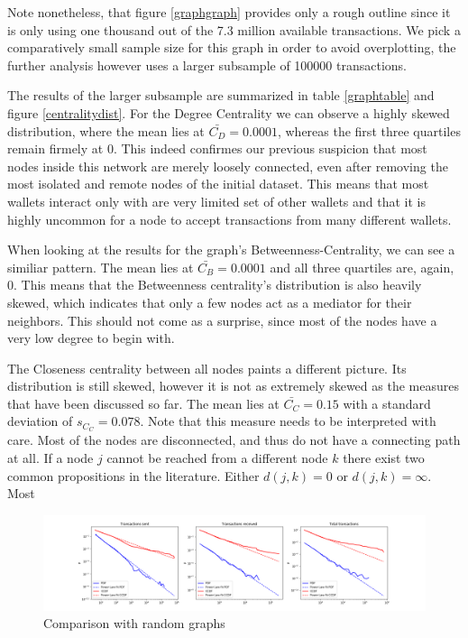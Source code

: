 Note nonetheless, that figure \ref{graphgraph} provides only a rough outline since it is only using one thousand out of the 7.3 million available transactions. We pick a comparatively small sample size for this graph in order to avoid overplotting, the further analysis however uses a larger subsample of 100000 transactions.

The results of the larger subsample are summarized in table \ref{graphtable} and figure \ref{centralitydist}. For the Degree Centrality we can observe a highly skewed distribution, where the mean lies at $\bar{C_D} = 0.0001$, whereas the first three quartiles remain firmely at $0$. This indeed confirmes our previous suspicion that most nodes inside this network are merely loosely connected, even after removing the most isolated and remote nodes of the initial dataset. This means that most wallets interact only with are very limited set of other wallets and that it is highly uncommon for a node to accept transactions from many different wallets.

When looking at the results for the graph's Betweenness-Centrality, we can see a similiar pattern. The mean lies at $\bar{C_B}=0.0001$ and all three quartiles are, again, $0$. This means that the Betweenness centrality's distribution is also heavily skewed, which indicates that only a few nodes act as a mediator for their neighbors. This should not come as a surprise, since most of the nodes have a very low degree to begin with.

The Closeness centrality between all nodes paints a different picture. Its distribution is still skewed, however it is not as extremely skewed as the measures that have been discussed so far. The mean lies at $\bar{C_C}=0.15$ with a standard deviation of $s_{C_C} = 0.078$. Note that this measure needs to be interpreted with care. Most of the nodes are disconnected, and thus do not have a connecting path at all. If a node $j$ cannot be reached from a different node $k$ there exist two common propositions in the literature. Either $d(j, k) = 0$ or $d(j, k)=\infty$. Most {\par}

\begin{figure}[ht]
\centering
\includegraphics[width=\textwidth]{../analysis/power-law-fit.png}
\caption{Comparison with random graphs}
\label{powerlaw}
\end{figure}

